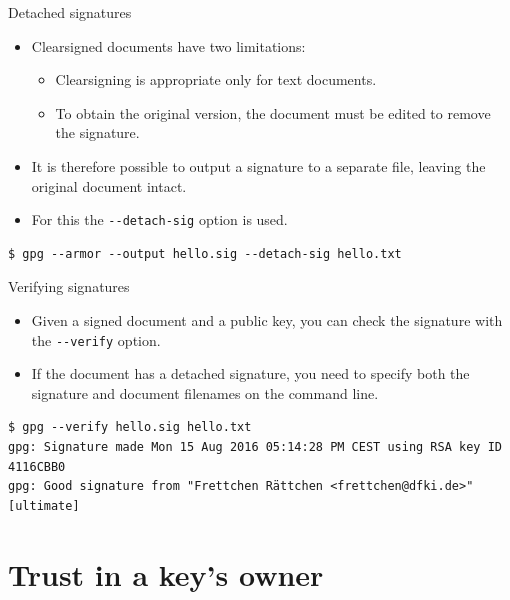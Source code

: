 \documentclass[
mode=present,
paper=smartboard,
size=20pt,
]{powerdot}
\newcommand{\clopt}[1]{\texttt{{-}#1}}
\begin{document}
\makeatletter\renewcommand{\verbatim@font}{\footnotesize\tt}\makeatother
\begin{slide}[method=direct]{Detached signatures}
  \begin{itemize}
  \item Clearsigned documents have two limitations:
    \begin{itemize}
    \item Clearsigning is appropriate only for text documents.
    \item To obtain the original version, the document must be edited
      to remove the signature.
    \end{itemize}
  \item It is therefore possible to output a signature to a separate
    file, leaving the original document intact.
  \item For this the \clopt{-detach-sig} option is used.
  \end{itemize}
\begin{verbatim}
$ gpg --armor --output hello.sig --detach-sig hello.txt
\end{verbatim}
\end{slide}

\begin{slide}[method=direct]{Verifying signatures}
  \begin{itemize}
  \item Given a signed document and a public key, you can check the
    signature with the \clopt{-verify} option.
  \item If the document has a detached signature, you need to specify
    both the signature and document filenames on the command line.
  \end{itemize}
\begin{verbatim}
$ gpg --verify hello.sig hello.txt
gpg: Signature made Mon 15 Aug 2016 05:14:28 PM CEST using RSA key ID 4116CBB0
gpg: Good signature from "Frettchen Rättchen <frettchen@dfki.de>" [ultimate]
\end{verbatim}
\end{slide}

\section{Trust in a key's owner}
\end{document}
